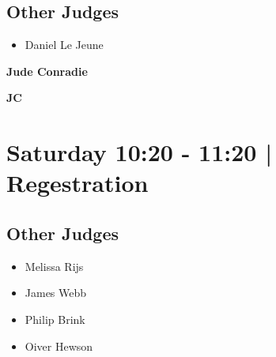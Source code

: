 \documentclass[10pt, A5]{article}
\newcommand{\newtitle}[1]{\begin{center}{\Huge\bfseries #1 }\\ \vspace{5mm}\end{center}}
\newcommand{\newsubtitle}[1]{\begin{center}{\color{grey}\Large\bfseries #1 }\\ \vspace{5mm}\end{center}}
\begin{document}
        \subsection*{Other Judges}
        
            \begin{itemize}
                            \item Daniel Le Jeune
                        \end{itemize}
        

    
	\clearpage

		\newtitle{Jude Conradie}
	\newsubtitle{JC}

            \section*{Saturday 10:20
        -
        11:20
        |
         Regestration}
        
                
        \subsection*{Other Judges}
        
            \begin{itemize}
                            \item Melissa Rijs
                            \item James Webb
                            \item Philip Brink
                            \item Oiver Hewson
                        \end{itemize}
        

    
	\clearpage

	
\end{document}
